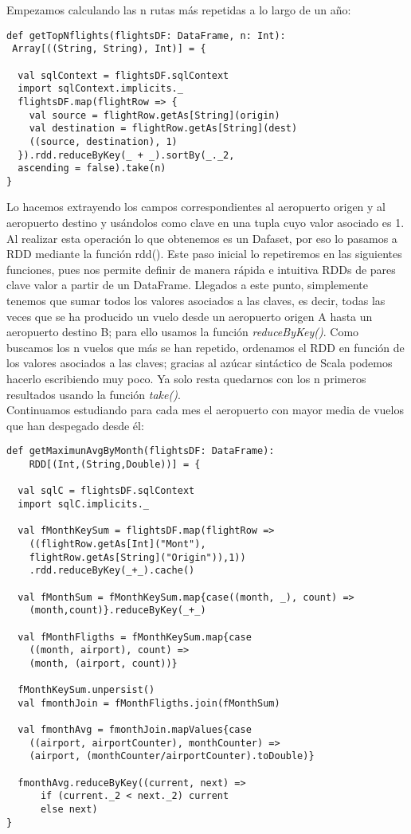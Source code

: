 Empezamos calculando las n rutas más repetidas a lo largo de un año:\\

\begin{lstlisting}[frame=single]
def getTopNflights(flightsDF: DataFrame, n: Int): 
 Array[((String, String), Int)] = {
  	
  val sqlContext = flightsDF.sqlContext
  import sqlContext.implicits._
  flightsDF.map(flightRow => {
    val source = flightRow.getAs[String](origin)
    val destination = flightRow.getAs[String](dest)
    ((source, destination), 1)
  }).rdd.reduceByKey(_ + _).sortBy(_._2, 
  ascending = false).take(n)
}
\end{lstlisting}

Lo hacemos extrayendo los campos correspondientes al aeropuerto origen y al aeropuerto destino y usándolos como clave en una tupla cuyo valor asociado es 1. Al realizar esta operación lo que obtenemos es un Dafaset, por eso lo pasamos a RDD mediante la función rdd(). Este paso inicial lo repetiremos en las siguientes funciones, pues nos permite definir de manera rápida e intuitiva RDDs de pares clave valor a partir de un DataFrame. Llegados a este punto, simplemente tenemos que sumar todos los valores asociados a las claves, es decir, todas las veces que se ha producido un vuelo desde un aeropuerto origen A hasta un aeropuerto destino B; para ello usamos la función \textit{reduceByKey()}. Como buscamos los n vuelos que más se han repetido, ordenamos el RDD en función de los valores asociados a las claves; gracias al azúcar sintáctico de Scala podemos hacerlo escribiendo muy poco. Ya solo resta quedarnos con los n primeros resultados usando la función \textit{take()}.\\


Continuamos estudiando para cada mes el aeropuerto con mayor media de vuelos que han despegado desde él:\\

\begin{lstlisting}[frame=single]
def getMaximunAvgByMonth(flightsDF: DataFrame): 
	RDD[(Int,(String,Double))] = {
  
  val sqlC = flightsDF.sqlContext
  import sqlC.implicits._

  val fMonthKeySum = flightsDF.map(flightRow =>
    ((flightRow.getAs[Int]("Mont"), 
    flightRow.getAs[String]("Origin")),1))
    .rdd.reduceByKey(_+_).cache()

  val fMonthSum = fMonthKeySum.map{case((month, _), count) =>
    (month,count)}.reduceByKey(_+_)

  val fMonthFligths = fMonthKeySum.map{case
  	((month, airport), count) =>
    (month, (airport, count))}

  fMonthKeySum.unpersist()
  val fmonthJoin = fMonthFligths.join(fMonthSum)

  val fmonthAvg = fmonthJoin.mapValues{case 
  	((airport, airportCounter), monthCounter) =>
  	(airport, (monthCounter/airportCounter).toDouble)}
  
  fmonthAvg.reduceByKey((current, next) =>
      if (current._2 < next._2) current
      else next)
}
\end{lstlisting}

